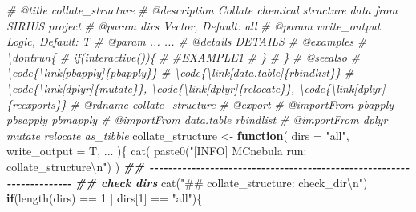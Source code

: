\documentclass[
]{article}
\newenvironment{Shaded}{\begin{snugshade}}{\end{snugshade}}
\newcommand{\AttributeTok}[1]{\textcolor[rgb]{0.77,0.63,0.00}{#1}}
\newcommand{\CommentTok}[1]{\textcolor[rgb]{0.56,0.35,0.01}{\textit{#1}}}
\newcommand{\ControlFlowTok}[1]{\textcolor[rgb]{0.13,0.29,0.53}{\textbf{#1}}}
\newcommand{\DecValTok}[1]{\textcolor[rgb]{0.00,0.00,0.81}{#1}}
\newcommand{\DocumentationTok}[1]{\textcolor[rgb]{0.56,0.35,0.01}{\textbf{\textit{#1}}}}
\newcommand{\FunctionTok}[1]{\textcolor[rgb]{0.00,0.00,0.00}{#1}}
\newcommand{\NormalTok}[1]{#1}
\newcommand{\OtherTok}[1]{\textcolor[rgb]{0.56,0.35,0.01}{#1}}
\newcommand{\SpecialCharTok}[1]{\textcolor[rgb]{0.00,0.00,0.00}{#1}}
\newcommand{\StringTok}[1]{\textcolor[rgb]{0.31,0.60,0.02}{#1}}
\begin{document}
\begin{Shaded}
\begin{Highlighting}[]
\CommentTok{\#\textquotesingle{} @title collate\_structure}
\CommentTok{\#\textquotesingle{} @description Collate chemical structure data from SIRIUS project}
\CommentTok{\#\textquotesingle{} @param dirs Vector, Default: \textquotesingle{}all\textquotesingle{}}
\CommentTok{\#\textquotesingle{} @param write\_output Logic, Default: T}
\CommentTok{\#\textquotesingle{} @param ... ...}
\CommentTok{\#\textquotesingle{} @details DETAILS}
\CommentTok{\#\textquotesingle{} @examples }
\CommentTok{\#\textquotesingle{} \textbackslash{}dontrun\{}
\CommentTok{\#\textquotesingle{} if(interactive())\{}
\CommentTok{\#\textquotesingle{}  \#EXAMPLE1}
\CommentTok{\#\textquotesingle{}  \}}
\CommentTok{\#\textquotesingle{} \}}
\CommentTok{\#\textquotesingle{} @seealso }
\CommentTok{\#\textquotesingle{}  \textbackslash{}code\{\textbackslash{}link[pbapply]\{pbapply\}\}}
\CommentTok{\#\textquotesingle{}  \textbackslash{}code\{\textbackslash{}link[data.table]\{rbindlist\}\}}
\CommentTok{\#\textquotesingle{}  \textbackslash{}code\{\textbackslash{}link[dplyr]\{mutate\}\}, \textbackslash{}code\{\textbackslash{}link[dplyr]\{relocate\}\}, \textbackslash{}code\{\textbackslash{}link[dplyr]\{reexports\}\}}
\CommentTok{\#\textquotesingle{} @rdname collate\_structure}
\CommentTok{\#\textquotesingle{} @export }
\CommentTok{\#\textquotesingle{} @importFrom pbapply pbsapply pbmapply}
\CommentTok{\#\textquotesingle{} @importFrom data.table rbindlist}
\CommentTok{\#\textquotesingle{} @importFrom dplyr mutate relocate as\_tibble}
\NormalTok{collate\_structure }\OtherTok{\textless{}{-}} 
  \ControlFlowTok{function}\NormalTok{(}
           \AttributeTok{dirs =} \StringTok{"all"}\NormalTok{,}
           \AttributeTok{write\_output =}\NormalTok{ T,}
\NormalTok{           ...}
\NormalTok{           )\{}
  \FunctionTok{cat}\NormalTok{( }\FunctionTok{paste0}\NormalTok{(}\StringTok{"[INFO] MCnebula run: collate\_structure}\SpecialCharTok{\textbackslash{}n}\StringTok{"}\NormalTok{) )}
  \DocumentationTok{\#\# {-}{-}{-}{-}{-}{-}{-}{-}{-}{-}{-}{-}{-}{-}{-}{-}{-}{-}{-}{-}{-}{-}{-}{-}{-}{-}{-}{-}{-}{-}{-}{-}{-}{-}{-}{-}{-}{-}{-}{-}{-}{-}{-}{-}{-}{-}{-}{-}{-}{-}{-}{-}{-}{-}{-}{-}{-}{-}{-}{-}{-}{-}{-}{-}{-}{-}{-}{-}{-}{-} }
  \DocumentationTok{\#\# check dirs}
  \FunctionTok{cat}\NormalTok{(}\StringTok{"\#\# collate\_structure: check\_dir}\SpecialCharTok{\textbackslash{}n}\StringTok{"}\NormalTok{)}
  \ControlFlowTok{if}\NormalTok{(}\FunctionTok{length}\NormalTok{(dirs) }\SpecialCharTok{==} \DecValTok{1} \SpecialCharTok{|}\NormalTok{ dirs[}\DecValTok{1}\NormalTok{] }\SpecialCharTok{==} \StringTok{"all"}\NormalTok{)\{}

\end{Highlighting}
\end{Shaded}
\end{document}
